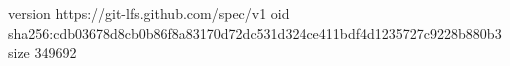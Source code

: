 version https://git-lfs.github.com/spec/v1
oid sha256:cdb03678d8cb0b86f8a83170d72dc531d324ce411bdf4d1235727c9228b880b3
size 349692
